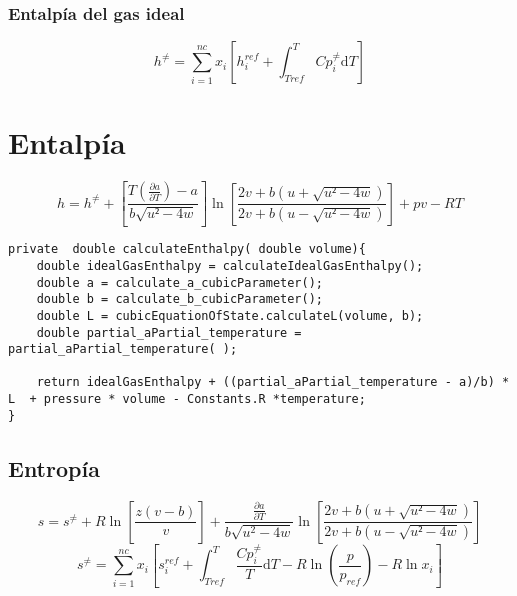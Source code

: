 \subsubsection{Entalpía del gas ideal}
\begin{equation}\label{eq:idealgasenthalpy}
h^{\neq} = \sum_{i=1}^{nc} x_i \left[ h_i^{ref} + \int_{Tref}^{T} Cp_i^{\neq} \mathrm{d}T \right]
\end{equation}

\section{Entalpía}
\begin{equation}\label{eq:enthalpy}
h = h^{\neq} + \left[ \frac{T(\frac{\partial a}{\partial T}) - a}{b\sqrt{u²-4w} }\right] 
\ln\left[\frac{2v+b\left(u + \sqrt{u²-4w}\right)}{2v+b\left(u - \sqrt{u²-4w}\right)}\right]
+ pv - RT
\end{equation}

\begin{lstlisting}[label=some-code,caption=Some Code]
private  double calculateEnthalpy( double volume){
    double idealGasEnthalpy = calculateIdealGasEnthalpy();
    double a = calculate_a_cubicParameter();
    double b = calculate_b_cubicParameter();
    double L = cubicEquationOfState.calculateL(volume, b);
    double partial_aPartial_temperature = partial_aPartial_temperature( );
    
    return idealGasEnthalpy + ((partial_aPartial_temperature - a)/b) * L  + pressure * volume - Constants.R *temperature;
}
\end{lstlisting}	



\subsection{Entropía}
\begin{equation}\label{eq:entropy}
s = s^{\neq} + R\ln\left[\frac{z(v-b)}{v}\right] + \frac{\frac{\partial a}{\partial T}}{b \sqrt{u^2 - 4w}}
\ln\left[\frac{2v+b\left(u + \sqrt{u²-4w}\right)}{2v+b\left(u - \sqrt{u²-4w}\right)}\right]
\end{equation}
\begin{equation}\label{eq:idealgasentropy}
s^{\neq} = \sum_{i=1}^{nc} x_i\left[s_i^{ref} + \int_{Tref}^T \frac{Cp_i^{\neq}}{T} \mathrm{d}T 
- R\ln \left(\frac{p}{p_{ref}}\right)- R\ln{x_i}
\right]
\end{equation}


